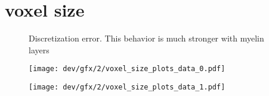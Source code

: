 \section{voxel size}
% 
\begin{figure}[!t]
\centering
\resizebox{1.0\textwidth}{!}{
\tikzset{external/export=false}
}
\caption[Discretization error]{Discretization error.
This behavior is much stronger with myelin layers}
\label{fig:vectorfield_disc_error}
\end{figure}
% 
\begin{figure}[p]
\centering
\texttt{[image: dev/gfx/2/voxel\_size\_plots\_data\_0.pdf]}
\caption[]{\dummy{}}
\label{fig:voxelsize}
\end{figure}
% 
\begin{figure}[p]
\centering
\texttt{[image: dev/gfx/2/voxel\_size\_plots\_data\_1.pdf]}
\caption[]{\dummy{}}
\label{fig:voxelsize}
\end{figure}
% 
% 
% 

